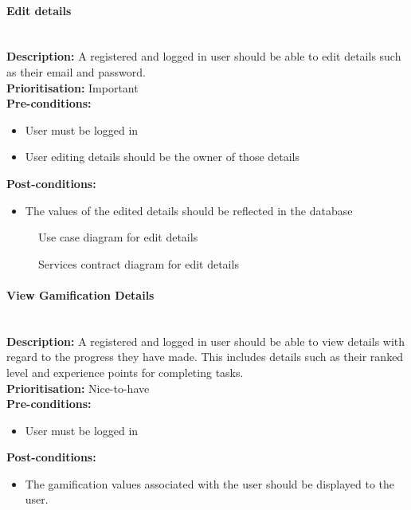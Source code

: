 \documentclass{article}
\begin{document}
	\paragraph{Edit details}\mbox{}\\
		\textbf{Description:} A registered and logged in user should be able to edit details such as their email and password.\\
		\textbf{Prioritisation:} Important\\		
		\textbf{Pre-conditions:}
			\begin{itemize}
				\item User must be logged in
				\item User editing details should be the owner of those details
			\end{itemize}
		\textbf{Post-conditions:}
			\begin{itemize}
				\item The values of the edited details should be reflected in the database
			\end{itemize}

		\begin{figure}[H]
			\caption{Use case diagram for edit details}
		\end{figure}		
		
		\begin{figure}[H]
			\caption{Services contract diagram for edit details}
		\end{figure}
	
	\paragraph{View Gamification Details}\mbox{}\\
		\textbf{Description:} A registered and logged in user should be able to view details with regard to the progress they have made. This includes details such as their ranked level and experience points for completing tasks.\\
		\textbf{Prioritisation:} Nice-to-have\\		
		\textbf{Pre-conditions:}
			\begin{itemize}
				\item User must be logged in
			\end{itemize}
		\textbf{Post-conditions:}
			\begin{itemize}
				\item The gamification values associated with the user should be displayed to the user.
			\end{itemize}
\end{document}
